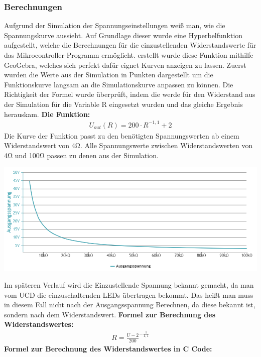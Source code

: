 \documentclass[paper=a4, 12pt]{scrreprt}
\begin{document}
			\subsubsection{Berechnungen}\hfill \break
			\label{sec:berechnungen}
			Aufgrund der Simulation der Spannungseinstellungen weiß man, wie die Spannungskurve aussieht. Auf Grundlage dieser wurde eine Hyperbelfunktion aufgestellt, welche die Berechnungen für die einzustellenden Widerstandswerte für das Mikrocontroller-Programm ermöglicht. \hfill \break
			erstellt wurde diese Funktion mithilfe GeoGebra, welches sich perfekt dafür eignet Kurven anzeigen zu lassen. Zuerst wurden die Werte aus der Simulation in Punkten dargestellt um die Funktionskurve langsam an die Simulationskurve anpassen zu können. \hfill \break
			Die Richtigkeit der Formel wurde überprüft, indem die werde für den Widerstand aus der Simulation für die Variable R eingesetzt wurden und das gleiche Ergebnis herauskam. \hfill \break \hfill \break
			\textbf{Die Funktion:} 
			\begin{align*} 
			U_{out}(R) = 200 \cdot R^{-1,1} + 2
			\end{align*}
			Die Kurve der Funktion passt zu den benötigten Spannungswerten ab einem Widerstandswert von 4Ω. Alle Spannungswerte zwischen Widerstandswerten von 4Ω und 100Ω passen zu denen aus der Simulation.
			\begin{adjustbox}{center,caption={Berechneter Spannungsverlauf bei Widerstandsänderung},label={fig:berechnungSPG},nofloat=figure,vspace=\bigskipamount}
				\includegraphics[width=\textwidth]{img/berechnungSPG.PNG}
			\end{adjustbox}
			Im späteren Verlauf wird die Einzustellende Spannung bekannt gemacht, da man vom UCD die einzuschaltenden LEDs übertragen bekommt. Das heißt man muss in diesem Fall nicht nach der Ausgangsspannung Berechnen, da diese bekannt ist, sondern nach dem Widerstandswert. \hfill \break \hfill \break
			\textbf{Formel zur Berechnung des Widerstandswertes:}
			\begin{align*} 
			R=\frac{ U - 2 }{ 200 }^{ -\frac{ 1 }{ 1,1 } }
			\end{align*}
			\textbf{Formel zur Berechnung des Widerstandswertes in C Code:}
			
			 
\end{document}
